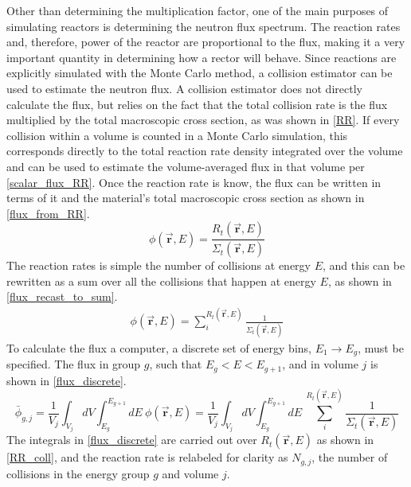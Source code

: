 Other than determining the multiplication factor, one of the main purposes of simulating reactors is determining the neutron flux spectrum.  The reaction rates and, therefore, power of the reactor are proportional to the flux, making it a very important quantity in determining how a rector will behave.  Since reactions are explicitly simulated with the  Monte Carlo method, a collision estimator can be used to estimate the neutron flux.  A collision estimator does not directly calculate the flux, but relies on the fact that the total collision rate is the flux multiplied by the total macroscopic cross section, as was shown in \eqref{RR}.  If every collision within a volume is counted in a Monte Carlo simulation, this corresponds directly to the total reaction rate density integrated over the volume and can be used to estimate the volume-averaged flux in that volume per \eqref{scalar_flux_RR}.  Once the reaction rate is know, the flux can be written in terms of it and the material's total macroscopic cross section as shown in \eqref{flux_from_RR}.
%
\begin{equation}
\label{flux_from_RR}
\phi(\boldsymbol{\vec{r}},E) = \frac{ R_t(\boldsymbol{\vec{r}},E) }{  \Sigma_t(\boldsymbol{\vec{r}},E) }
\end{equation}
%
The reaction rates is simple the number of collisions at energy $E$, and this can be rewritten as a sum over all the collisions that happen at energy $E$, as shown in \eqref{flux_recast_to_sum}.
%
\begin{equation}
\label{flux_recast_to_sum}
\begin{gathered}
\phi(\boldsymbol{\vec{r}},E) = \sum_{i}^{R_t(\boldsymbol{\vec{r}},E)} \frac{ 1 }{  \Sigma_t(\boldsymbol{\vec{r}},E) }
\end{gathered}
\end{equation}
%
To calculate the flux a computer, a discrete set of energy bins, $E_1 \rightarrow E_g$, must be specified.  The flux in group $g$, such that $E_g < E < E_{g+1}$, and in volume $j$ is shown in \eqref{flux_discrete}.
%
\begin{equation}
\label{flux_discrete}
\bar{\phi}_{g,j} = \frac{1}{V_j} \int_{V_j} dV \int_{E_g}^{E_{g+1}} dE \: \phi(\boldsymbol{\vec{r}},E) = \frac{1}{V_j} \int_{V_j} dV \int_{E_g}^{E_{g+1}} dE \: \sum_{i}^{R_t(\boldsymbol{\vec{r}},E)} \frac{ 1 }{  \Sigma_t(\boldsymbol{\vec{r}},E) }
\end{equation}
%
The integrals in \eqref{flux_discrete} are carried out over $R_t(\boldsymbol{\vec{r}},E)$ as shown in \eqref{RR_coll}, and the reaction rate is relabeled for clarity as $N_{g,j}$, the number of collisions in the energy group $g$ and volume $j$. 
